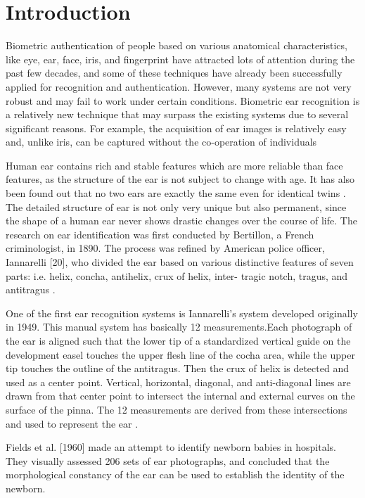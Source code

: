 \chapter{Introduction} \label{sec:intro} Biometric authentication of people based on various anatomical characteristics, like eye, ear, face, iris, and fingerprint have attracted lots of attention during the past few decades, and some of these techniques have already been successfully applied for recognition and authentication. However, many systems are not very robust and may fail to work under certain conditions. Biometric ear recognition is a relatively new technique that may surpass the existing systems due to several significant reasons. For example, the acquisition of ear images is relatively easy and, unlike iris, can be captured without the co-operation of individuals \cite{pflug2012ear}

Human ear contains rich and stable features which are more reliable than face features, as the structure of the ear is not subject to change with age. It has also been found out that no two ears are exactly the same even for identical twins \cite{abaza}. The detailed structure of ear is not only very unique but also permanent, since the shape of a human ear never shows drastic changes over the course of life. The research on ear identification was first conducted by Bertillon, a French criminologist, in 1890. The process was refined by American police officer, Iannarelli [20], who divided the ear based on various distinctive features of seven parts: i.e. helix, concha, antihelix, crux of helix, inter- tragic notch, tragus, and antitragus \cite{tariq}.

One of the first ear recognition systems is Iannarelli's system developed originally in 1949. This manual system has basically 12 measurements.Each photograph of the ear is aligned such that the lower tip of a standardized vertical guide on the development easel touches the upper flesh line of the cocha area, while the upper tip touches the outline of the antitragus. Then the crux of helix is detected and used as a center point. Vertical, horizontal, diagonal, and anti-diagonal lines are drawn from that center point to intersect the internal and external curves on the surface of the pinna. The 12 measurements are derived from these intersections and used to represent the ear \cite{abaza}.

Fields et al. [1960] made an attempt to identify newborn babies in hospitals. They visually assessed 206 sets of ear photographs, and concluded that the morphological constancy of the ear can be used to establish the identity of the newborn.

